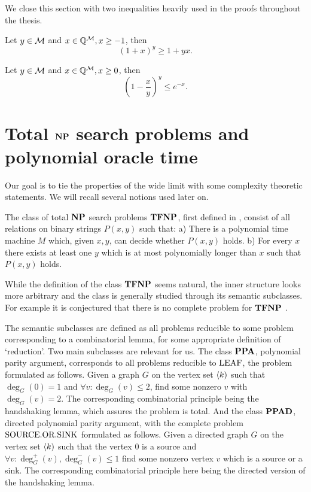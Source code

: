 We close this section with two inequalities heavily used in the proofs throughout the thesis.

\begin{thrm*}
Let $y \in \mathcal{M}$ and $x\in \mathbb{Q}^{\mathcal{M}}, x\geq -1$, then
\[(1+x)^y \geq 1+yx.\]
\end{thrm*}

\begin{thrm*}
Let $y \in \mathcal{M}$ and $x\in \mathbb{Q}^{\mathcal{M}}, x\geq 0$, then
\[\left(1-\frac{x}{y}\right)^y \leq e^{-x}.\]
\end{thrm*}

\section*{Total $\textbf{NP}$ search problems and polynomial oracle time}

Our goal is to tie the properties of the wide limit with some complexity theoretic statements. We will recall several notions used later on.

The class of total $\textbf{NP}$ search problems $\textbf{TFNP}$, first defined in \cite{megiddo1991total}, consist of all relations on binary strings $P(x,y)$ such that: a) There is a polynomial time machine $M$ which, given $x,y$, can decide whether $P(x,y)$ holds. b) For every $x$ there exists at least one $y$ which is at most polynomially longer than $x$ such that $P(x,y)$ holds.

While the definition of the class $\textbf{TFNP}$ seems natural, the inner structure looks more arbitrary and the class is generally studied through its semantic subclasses. For example it is conjectured that there is no complete problem for $\textbf{TFNP}$ \cite{goldberg2018tfnp}.

The semantic subclasses are defined as all problems reducible to some problem corresponding to a combinatorial lemma, for some appropriate definition of `reduction'. Two main subclasses are relevant for us. The class $\textbf{PPA}$, polynomial parity argument, corresponds to all problems reducible to $\text{LEAF}$, the problem formulated as follows. Given a graph $G$ on the vertex set $\langle k)$ such that $\deg_G(0)=1$ and $\forall v: \deg_G(v)\leq 2$, find some nonzero $v$ with $\deg_G(v)=2$. The corresponding combinatorial principle being the handshaking lemma, which assures the problem is total. And the class $\textbf{PPAD}$, directed polynomial parity argument, with the complete problem $\text{SOURCE.OR.SINK}$ formulated as follows. Given a directed graph $G$ on the vertex set $\langle k)$ such that the vertex $0$ is a source and $\forall v: \deg_G^+(v),\deg_G^-(v)\leq 1$ find some nonzero vertex $v$ which is a source or a sink. The corresponding combinatorial principle here being the directed version of the handshaking lemma.

